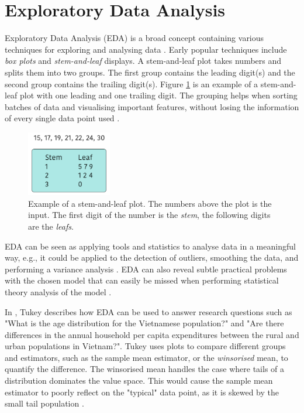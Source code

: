 \section{Exploratory Data Analysis}
Exploratory Data Analysis (EDA) is a broad concept containing various techniques for exploring and analysing data \cite{Anselin1999, Gelman2003, Hoaglin2003, Tukey1977, Velleman1981}.
Early popular techniques include \emph{box plots} and \emph{stem-and-leaf} displays.
A stem-and-leaf plot takes numbers and splits them into two groups.
The first group contains the leading digit(s) and the second group contains the trailing digit(s).
Figure \ref{fig:stem-leaf-plot} is an example of a stem-and-leaf plot with one leading and one trailing digit.
The grouping helps when sorting batches of data and visualising important features, without losing the information of every single data point used \cite{Velleman1981}.

\begin{figure} [h!]
    \centering
    \includegraphics[width=0.33\textwidth]{figures/stem-leaf-plot}
    \caption[Example of a stem-and-leaf plot]
    {\small Example of a stem-and-leaf plot. The numbers above the plot is the input.
    The first digit of the number is the \emph{stem}, the following digits are the \emph{leafs}.}
    \label{fig:stem-leaf-plot}
\end{figure}

EDA can be seen as applying tools and statistics to analyse data in a meaningful way, e.g., it could be applied to the detection of outliers, smoothing the data, and performing a variance analysis \cite{Anselin1999, Hoaglin2003, Tukey1977, Velleman1981}.
EDA can also reveal subtle practical problems with the chosen model that can easily be missed when performing statistical theory analysis of the model \cite{Gelman2003}.

In \cite{Tukey1977}, Tukey describes how EDA can be used to answer research questions such as "What is the age distribution for the Vietnamese population?" and "Are there differences in
the annual household per capita expenditures between the rural and urban populations in Vietnam?".
Tukey uses plots to compare different groups and estimators, such as the sample mean estimator, or the \emph{winsorised} mean, to quantify the difference.
The winsorised mean handles the case where tails of a distribution dominates the value space.  
This would cause the sample mean estimator to poorly reflect on the "typical" data point, as it is skewed by the small tail population \cite{Tukey1977}.

